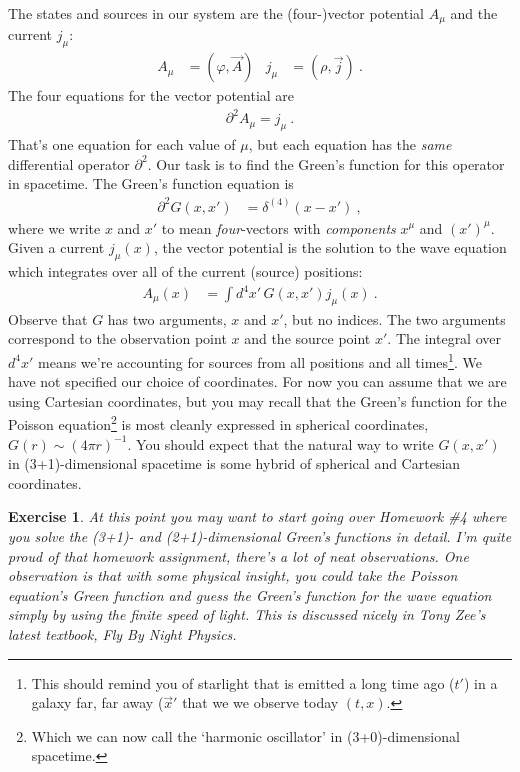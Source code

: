 \documentclass[
  11pt,
	colorful,
	raggedright,
]{tufte-style-thesis-flip}
\newtheorem{exercise}{Exercise}[section]
\begin{document}
The states and sources in our system are the (four-)vector potential $A_\mu$ and the current $j_\mu$: 
\begin{align}
  A_\mu &= (\varphi, \vec{A})
  &
  j_\mu &= (\rho, \vec{j}) \ .
\end{align}
The four equations for the vector potential are
\begin{align}
  \partial^2 A_\mu = j_\mu \ .
\end{align}
That's one equation for each value of $\mu$, but each equation has the \emph{same} differential operator $\partial^2$. Our task is to find the Green's function for this operator in spacetime. The Green's function equation is
\begin{align}
  \partial^2 G(x,x') &= \delta^{(4)}(x-x') \ ,
  \label{eq:wave:eq:Greens:eq}
\end{align}
where we write $x$ and $x'$ to mean \emph{four}-vectors with \emph{components} $x^\mu$ and $(x')^\mu$. Given a current $j_\mu(x)$, the vector potential is the solution to the wave equation which integrates over all of the current (source) positions:
\begin{align}
  A_\mu(x) &= \int d^4x' \, G(x,x') j_\mu(x) \ .
\end{align}
Observe that $G$ has two arguments, $x$ and $x'$, but no indices. The two arguments correspond to the observation point $x$ and the source point $x'$. The integral over $d^4x'$ means we're accounting for sources from all positions and all times\footnote{This should remind you of starlight that is emitted a long time ago ($t'$) in a galaxy far, far away ($\vec{x}'$ that we we observe today $(t,x)$.}. We have not specified our choice of coordinates. For now you can assume that we are using Cartesian coordinates, but you may recall that the Green's function for the Poisson equation\footnote{Which we can now call the `harmonic oscillator' in (3+0)-dimensional spacetime.} is most cleanly expressed in spherical coordinates, $G(r)\sim (4\pi r)^{-1}$. You should expect that the natural way to write $G(x,x')$ in (3+1)-dimensional spacetime is some hybrid of spherical and Cartesian coordinates.

\begin{exercise}\label{ex:guess:Greens}
At this point you may want to start going over Homework \#4 where \emph{you} solve the (3+1)- and (2+1)-dimensional Green's functions in detail. I'm quite proud of that homework assignment, there's a lot of neat observations. One observation is that with some physical insight, you could take the Poisson equation's Green function and \emph{guess} the Green's function for the wave equation simply by using the finite speed of light. This is discussed nicely in Tony Zee's latest textbook, \emph{Fly By Night Physics}. 
\end{exercise}
\end{document}
